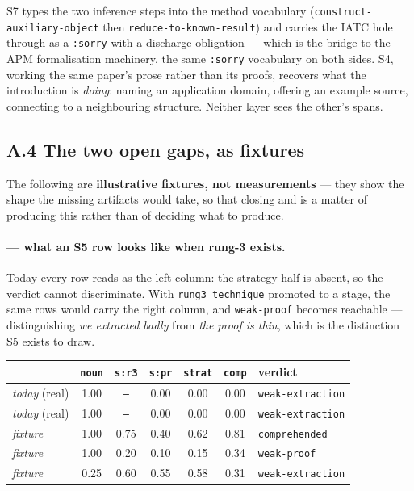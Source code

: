 S7 types the two inference steps into the method vocabulary
(\texttt{construct-auxiliary-object} then \texttt{reduce-to-known-result}) and
carries the IATC hole through as a \texttt{:sorry} with a discharge obligation
--- which is the bridge to the APM formalisation machinery, the same
\texttt{:sorry} vocabulary on both sides. S4, working the same paper's prose
rather than its proofs, recovers what the introduction is \emph{doing}: naming
an application domain, offering an example source, connecting to a neighbouring
structure. Neither layer sees the other's spans.

\subsection*{A.4 The two open gaps, as fixtures}

The following are \textbf{illustrative fixtures, not measurements} --- they show
the shape the missing artifacts would take, so that closing  and
 is a matter of producing this rather than of deciding what to produce.

\paragraph{ --- what an S5 row looks like when rung-3 exists.}
Today every row reads as the left column: the strategy half is absent, so the
verdict cannot discriminate. With \texttt{rung3\_technique} promoted to a
stage, the same rows would carry the right column, and \texttt{weak-proof}
becomes reachable --- distinguishing \emph{we extracted badly} from \emph{the
proof is thin}, which is the distinction S5 exists to draw.

\begin{center}\small
\begin{tabular}{l|ccccc|l}
 & \texttt{noun} & \texttt{s:r3} & \texttt{s:pr} & \texttt{strat} & \texttt{comp} & \textbf{verdict}\\
\hline
\emph{today} (real) & 1.00 & \texttt{--} & 0.00 & 0.00 & 0.00 & \texttt{weak-extraction}\\
\emph{today} (real) & 1.00 & \texttt{--} & 0.00 & 0.00 & 0.00 & \texttt{weak-extraction}\\
\hline
\emph{fixture} & 1.00 & 0.75 & 0.40 & 0.62 & 0.81 & \texttt{comprehended}\\
\emph{fixture} & 1.00 & 0.20 & 0.10 & 0.15 & 0.34 & \texttt{weak-proof}\\
\emph{fixture} & 0.25 & 0.60 & 0.55 & 0.58 & 0.31 & \texttt{weak-extraction}\\
\end{tabular}
\end{center}

